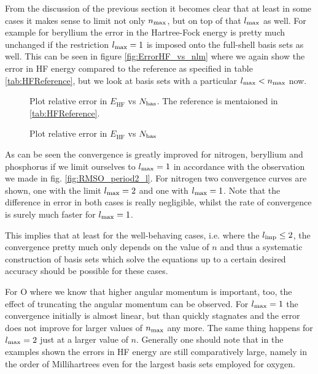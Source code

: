 From the discussion of the previous section
it becomes clear that at least in some cases it makes sense to
limit not only $n_\text{max}$, but on top of that $l_\text{max}$ as well.
For example for beryllium the error
in the Hartree-Fock energy is pretty much unchanged if the
restriction $l_\text{max} = 1$ is imposed onto the full-shell \CS basis sets as well.
This can be seen in figure \vref{fig:ErrorHF_vs_nlm}
where we again show the error in HF energy compared to the reference
as specified in table \vref{tab:HFReference},
but we look at basis sets with a particular $l_\text{max} < n_\text{max}$ now.

\begin{figure}
	\centering
	\caption{Plot relative error in $E_\text{HF}$ vs $N_\text{bas}$.
		The reference is mentaioned in \vref{tab:HFReference}.}
	\label{fig:ErrorHF_vs_nlm}
\end{figure}


\begin{figure}
	\centering
	\caption{Plot relative error in $E_\text{HF}$ vs $N_\text{bas}$}
	\label{fig:ErrorHF_vs_nlm_O}
\end{figure}

As can be seen the convergence is greatly improved
for nitrogen, beryllium and phosphorus
if we limit ourselves to $l_\text{max} = 1$
in accordance with the observation we made in fig.
\vref{fig:RMSO_period2_l}.
For nitrogen two convergence curves are shown,
one with the limit $l_\text{max} = 2$ and one with $l_\text{max} = 1$.
Note that the difference in \HF error in both cases
is really negligible, whilst the rate of convergence is
surely much faster for $l_\text{max} = 1$.

\defineabbr{AM}{AM\xspace}{angular momentum}
This implies that at least for the well-behaving cases,
i.e. where the $l_\text{imp} \le 2$,
the convergence pretty much only depends on the value
of $n$ and thus a systematic construction of basis
sets which solve the \HF equations up to a certain
desired accuracy should be possible for these cases.

For O where we know that higher angular momentum is important, too,
the effect of truncating the angular momentum can be observed.
For $l_\text{max} = 1$ the convergence initially is almost linear,
but than quickly stagnates and the error does not improve for larger
values of $n_\text{max}$ any more. The same thing happens for
$l_\text{max} = 2$ just at a larger value of $n$.
Generally one should note that in the examples shown
the errors in HF energy are still comparatively large,
namely in the order of Millihartrees even for the largest
basis sets employed for oxygen.

